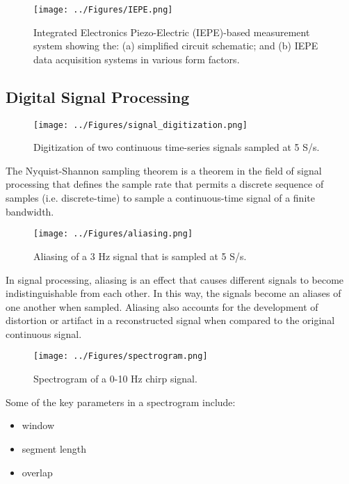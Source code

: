 \documentclass[12pt,letter]{article}
\numberwithin{ex}{section} %
\numberwithin{re}{section} %
\begin{document}


\begin{figure}[H]
    \centering
    \texttt{[image: ../Figures/IEPE.png]}
    \caption{Integrated Electronics Piezo-Electric (IEPE)-based measurement system showing the: (a) simplified circuit schematic\protect\footnotemark[1]; and (b) IEPE data acquisition systems in various form factors.}
    \label{fig:IEPE}
\end{figure} 







\subsection{Digital Signal Processing}





\begin{figure}[H]
    \centering
    \texttt{[image: ../Figures/signal\_digitization.png]}
    \caption{Digitization of two continuous time-series signals sampled at 5 S/s.}
    \label{fig:signal_digitization}
\end{figure}


The Nyquist-Shannon sampling theorem is a theorem in the field of signal processing that defines the sample rate that permits a discrete sequence of samples (i.e. discrete-time) to sample a continuous-time signal of a finite bandwidth. 

\begin{figure}[H]
    \centering
    \texttt{[image: ../Figures/aliasing.png]}
    \caption{Aliasing of a 3 Hz signal that is sampled at 5 S/s.}
    \label{fig:aliasing}
\end{figure}

In signal processing, aliasing is an effect that causes different signals to become indistinguishable from each other.  In this way, the signals become an aliases of one another when sampled. Aliasing also accounts for the development of distortion or artifact in a reconstructed signal when compared to the original continuous signal.


\begin{figure}[H]
    \centering
    \texttt{[image: ../Figures/spectrogram.png]}
    \caption{Spectrogram of a 0-10 Hz chirp signal.}
    \label{fig:spectrogram}
\end{figure}

Some of the key parameters in a spectrogram include:

\begin{itemize}
\item window
\item segment length
\item overlap
\end{itemize}
\end{document}
